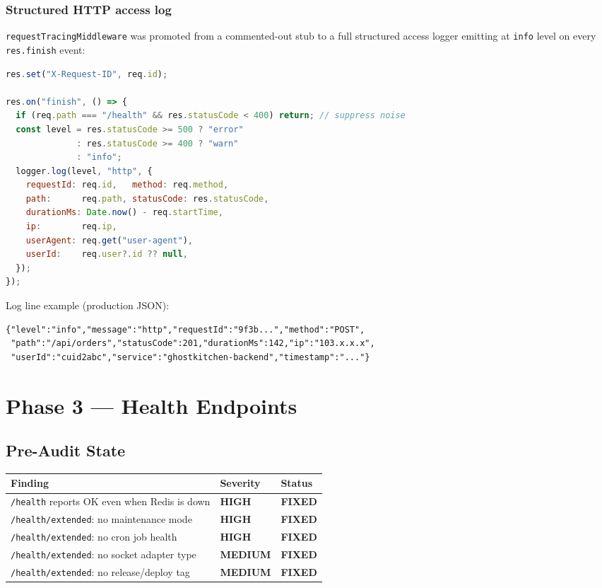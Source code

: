 \documentclass[12pt,a4paper]{article}
\newcommand{\cellok}[1]{\cellcolor{ok!15}\textbf{\color{ok}#1}}
\newcommand{\cellwarn}[1]{\cellcolor{warn!20}\textbf{\color{warn}#1}}
\newcommand{\cellinfo}[1]{\cellcolor{info!10}\textbf{\color{info}#1}}
\begin{document}
\subsubsection{Structured HTTP access log}

\texttt{requestTracingMiddleware} was promoted from a commented-out stub to a
full structured access logger emitting at \texttt{info} level on every
\texttt{res.finish} event:

\begin{lstlisting}[language=JavaScript,caption={requestTracing.middleware.js}]
res.set("X-Request-ID", req.id);

res.on("finish", () => {
  if (req.path === "/health" && res.statusCode < 400) return; // suppress noise
  const level = res.statusCode >= 500 ? "error"
              : res.statusCode >= 400 ? "warn"
              : "info";
  logger.log(level, "http", {
    requestId: req.id,   method: req.method,
    path:      req.path, statusCode: res.statusCode,
    durationMs: Date.now() - req.startTime,
    ip:        req.ip,
    userAgent: req.get("user-agent"),
    userId:    req.user?.id ?? null,
  });
});
\end{lstlisting}

Log line example (production JSON):
\begin{lstlisting}[caption={Sample production log output}]
{"level":"info","message":"http","requestId":"9f3b...","method":"POST",
 "path":"/api/orders","statusCode":201,"durationMs":142,"ip":"103.x.x.x",
 "userId":"cuid2abc","service":"ghostkitchen-backend","timestamp":"..."}
\end{lstlisting}

\newpage

\section{Phase 3 — Health Endpoints}

\subsection{Pre-Audit State}

\begin{longtable}{p{5cm}p{3.5cm}p{5.5cm}}
\toprule
\rowcolor{tableheadbg}
\textbf{\color{white}Finding} & \textbf{\color{white}Severity} & \textbf{\color{white}Status} \\
\midrule
\texttt{/health} reports OK even when Redis is down & \cellwarn{HIGH} & \cellok{FIXED} \\
\texttt{/health/extended}: no maintenance mode & \cellwarn{HIGH} & \cellok{FIXED} \\
\texttt{/health/extended}: no cron job health & \cellwarn{HIGH} & \cellok{FIXED} \\
\texttt{/health/extended}: no socket adapter type & \cellinfo{MEDIUM} & \cellok{FIXED} \\
\texttt{/health/extended}: no release/deploy tag & \cellinfo{MEDIUM} & \cellok{FIXED} \\
\bottomrule
\end{longtable}
\end{document}
